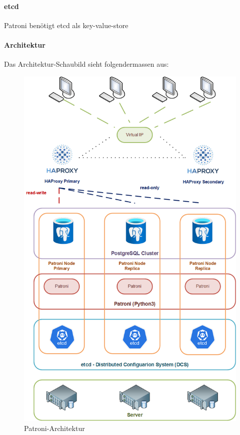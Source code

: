 \begin{flushleft}
    \paragraph{\gls{etcd}}
    Patroni benötigt etcd als key-value-store
\end{flushleft}
\begin{flushleft}
    \paragraph{Architektur}
    Das Architektur-Schaubild sieht folgendermassen aus:
    \begin{figure}[H]
        \centering
        \includegraphics[width=0.75\linewidth]{source/implementation/evaluation/postgresql_ha_solutions/patroni_architecture}
        \caption{Patroni-Architektur}
        \label{fig:patroni-architecture}
    \end{figure}
\end{flushleft}
